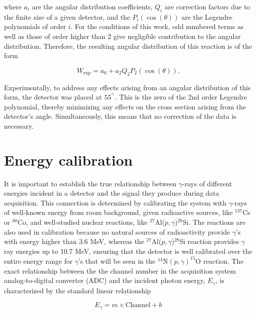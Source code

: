 \noindent where $a_{i}$ are the angular distribution coefficients, $Q_{i}$ are correction factors due to the finite size of a given detector, and the $P_{i} ( \cos (\theta) )$ are the Legendre polynomials of order $i$. For the conditions of this work, odd numbered terms as well as those of order higher than 2 give negligible contribution to the angular distribution. Therefore, the resulting angular distribution of this reaction is of the form

\begin{equation}
W_{\text{exp}} = a_{0} + a_{2} Q_{2} P_{2} ( \cos (\theta) ).
\end{equation}

Experimentally, to address any effects arising from an angular distribution of this form, the detector was placed at $55^{\degree}$. This is the zero of the 2nd order Legendre polynomial, thereby minimizing any effects on the cross section arising from the detector's angle. Simultaneously, this means that no correction of the data is necessary.


\section{Energy calibration}
\label{sec: energy calibration}

It is important to establish the true relationship between $\gamma$-rays of different energies incident in a detector and the signal they produce during data acquisition. This connection is determined by calibrating the system with $\gamma$-rays of well-known energy from room background, given radioactive sources, like $^{137}$Cs or $^{60}$Co, and well-studied nuclear reactions, like $^{27}$Al($p, \gamma$)$^{28}$Si. The reactions are also used in calibration because no natural sources of radioactivity provide $\gamma$'s with energy higher than 3.6 MeV, whereas the $^{27}$Al($p, \gamma$)$^{28}$Si reaction provides $\gamma$ ray energies up to 10.7 MeV, ensuring that the detector is well calibrated over the entire energy range for $\gamma$'s that will be seen in the $^{14}$N$\left( p,\gamma \right) ^{15}$O reaction. The exact relationship between the the channel number in the acquisition system analog-to-digital converter (ADC) and the incident photon energy, $E_{\gamma}$, is characterized by the standard linear relationship

\begin{equation}
E_{\gamma} = m \times \text{Channel} + b
\end{equation}

